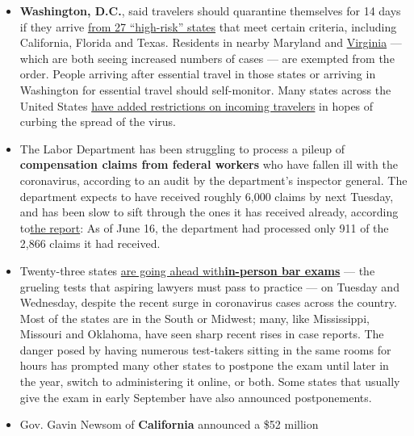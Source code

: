 \begin{itemize}
\item
  \textbf{Washington, D.C.}, said travelers should quarantine themselves
  for 14 days if they arrive
  \href{https://coronavirus.dc.gov/release/dc-health-releases-list-high-risk-states}{from
  27 ``high-risk'' states} that meet certain criteria, including
  California, Florida and Texas. Residents in nearby Maryland and
  \href{https://www.nytimes.com/interactive/2020/us/virginia-coronavirus-cases.html}{Virginia}
  --- which are both seeing increased numbers of cases --- are exempted
  from the order. People arriving after essential travel in those states
  or arriving in Washington for essential travel should self-monitor.
  Many states across the United States
  \href{https://www.nytimes.com/2020/07/10/travel/state-travel-restrictions.html}{have
  added restrictions on incoming travelers} in hopes of curbing the
  spread of the virus.
\item
  The Labor Department has been struggling to process a pileup of
  \textbf{compensation claims from federal workers} who have fallen ill
  with the coronavirus, according to an audit by the department's
  inspector general. The department expects to have received roughly
  6,000 claims by next Tuesday, and has been slow to sift through the
  ones it has received already, according
  to\href{https://www.oig.dol.gov/public/reports/oa/2020/19-20-004-04-001.pdf}{the
  report}: As of June 16, the department had processed only 911 of the
  2,866 claims it had received.
\item
  Twenty-three states
  \href{http://www.ncbex.org/ncbe-covid-19-updates/july-2020-bar-exam-jurisdiction-information/status-table/}{are
  going ahead
  with}\textbf{\href{http://www.ncbex.org/ncbe-covid-19-updates/july-2020-bar-exam-jurisdiction-information/status-table/}{in-person
  bar exams}} --- the grueling tests that aspiring lawyers must pass to
  practice --- on Tuesday and Wednesday, despite the recent surge in
  coronavirus cases across the country. Most of the states are in the
  South or Midwest; many, like Mississippi, Missouri and Oklahoma, have
  seen sharp recent rises in case reports. The danger posed by having
  numerous test-takers sitting in the same rooms for hours has prompted
  many other states to postpone the exam until later in the year, switch
  to administering it online, or both. Some states that usually give the
  exam in early September have also announced postponements.
\item
  Gov. Gavin Newsom of \textbf{California} announced a \$52 million

\end{itemize}
